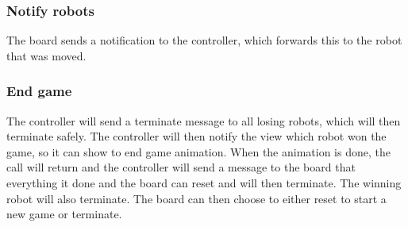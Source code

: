 	
	
	\subsubsection{Notify robots}
	The board sends a notification to the controller, which forwards this to the robot that was moved.	

	

	\subsubsection{End game}
	The controller will send a terminate message to all losing robots, which will then terminate safely. The controller will then notify the view which robot won the game, so it can show to end game animation. When the animation is done, the call will return and the controller will send a message to the board that everything it done and the board can reset and will then terminate. The winning robot will also terminate. The board can then choose to either reset to start a new game or terminate.

	
